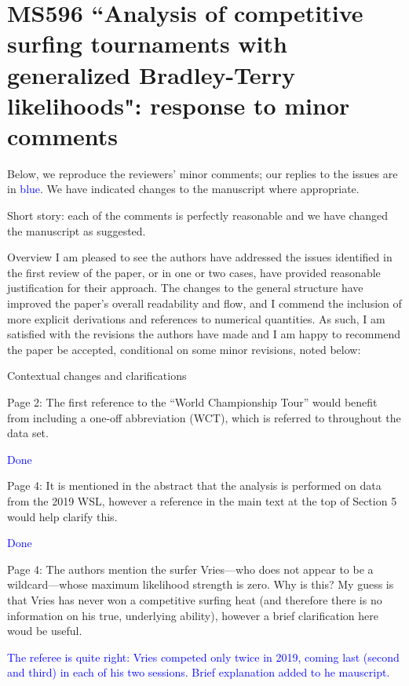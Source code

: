\documentclass[12pt]{article}
\begin{document}
\section*{MS596 ``Analysis of competitive surfing tournaments with generalized Bradley-Terry likelihoods": response to minor comments}

Below, we reproduce the reviewers' minor comments; our replies to
the issues are in \textcolor{blue}{blue}.  We have indicated changes
to the manuscript where appropriate.

Short story: each of the  comments is perfectly reasonable and we have 
changed the manuscript as suggested.




Overview I am pleased to see the authors have addressed the issues
identified in the first review of the paper, or in one or two cases,
have provided reasonable justification for their approach. The changes
to the general structure have improved the paper’s overall readability
and flow, and I commend the inclusion of more explicit derivations and
references to numerical quantities. As such, I am satisfied with the
revisions the authors have made and I am happy to recommend the paper
be accepted, conditional on some minor revisions, noted below:



Contextual changes and clarifications

Page 2: The first reference to the ``World Championship Tour'' would
benefit from including a one-off abbreviation (WCT), which is referred
to throughout the data set.

\textcolor{blue}{Done}

Page 4: It is mentioned in the abstract that the analysis is performed
on data from the 2019 WSL, however a reference in the main text at the
top of Section 5 would help clarify this.

\textcolor{blue}{Done}


Page 4: The authors mention the surfer Vries---who does not appear to
be a wildcard---whose maximum likelihood strength is zero. Why is
this? My guess is that Vries has never won a competitive surfing heat
(and therefore there is no information on his true, underlying
ability), however a brief clarification here woud be useful.

\textcolor{blue}{The referee is quite right: Vries competed only twice
  in 2019, coming last (second and third) in each of his two sessions.
  Brief explanation added to he mauscript.}
\end{document}
